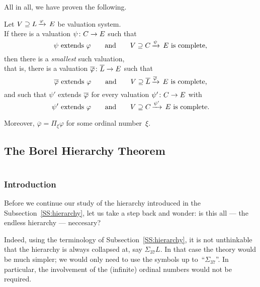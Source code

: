 \documentclass[main.tex]{subfiles}
\begin{document}
All in all, we have proven the following.
\begin{prop}
Let $V \supseteq L\,\smash{\xrightarrow{\varphi}\,E}$ 
be valuation system.\\
If there is a valuation $\psi\colon C\rightarrow E$ such that
\begin{equation*}
\text{$\psi$ extends~$\varphi$}
\qquad\text{and}\qquad
\text{$V \supseteq C\,\smash{\xrightarrow{\psi}\,E}$ is complete,}
\end{equation*}
then there is a \emph{smallest} such valuation,\\
that is, 
there is a valuation $\overline\varphi\colon \overline{L}\rightarrow E$
such that
\begin{equation*}
\text{$\overline{\varphi}$ extends~$\varphi$}
\qquad\text{and}\qquad
\text{$V \supseteq \overline{L}\,\smash{\xrightarrow{\overline{\varphi}}\,E}$ is complete,}
\end{equation*}
and such that 
$\psi'$ extends $\overline{\varphi}$
 for every valuation $\psi'\colon C\rightarrow E$ with
\begin{equation*}
\text{$\psi'$ extends~$\varphi$}
\qquad\text{and}\qquad
\text{$V \supseteq C\,\smash{\xrightarrow{\psi'}\,E}$ is complete.}
\end{equation*}

Moreover,
$\overline{\varphi} = \Pi_\xi \varphi$
for some ordinal number~$\xi$.
\end{prop}


%
%
\subsection{The Borel Hierarchy Theorem}$\,$\\
\label{SS:borel-hierarchy}
\subsubsection{Introduction}$\,$\\
Before we continue our study of the hierarchy introduced in the
Subsection~\ref{SS:hierarchy}, let us take a step back and wonder: 
 is this all --- the endless hierarchy --- neccesary?

Indeed,
using the terminology of Subsection~\ref{SS:hierarchy},
it is not unthinkable
that the hierarchy is always collapsed
at, say $\Sigma_{37} L$.
In that case 
the theory would be much simpler;
we would only need to
use the symbols up to~``$\Sigma_{37}$''.
In particular,
the involvement of the (infinite) ordinal numbers would not be required.
\end{document}
